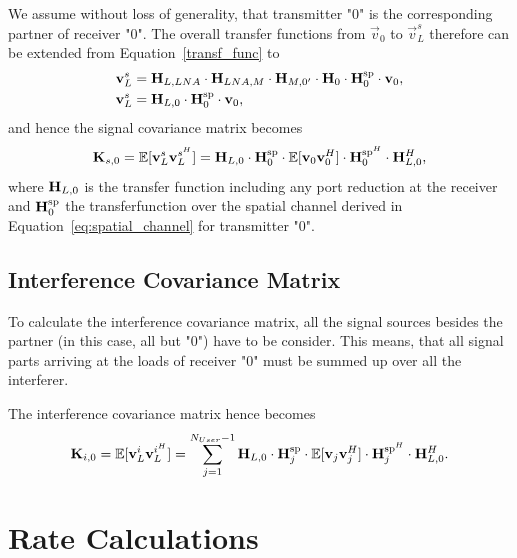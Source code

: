 We assume without loss of generality, that transmitter "0" is the corresponding partner of receiver "0".
The overall transfer functions from $\vec{v}_0$ to $\vec{v}_L^s$ therefore can be extended from Equation~\eqref{transf_func} to
\begin{align}
\label{eq:transfer_function}
 \mathbf{v}_L^s&= \mathbf{H}_{L,LNA}\cdot\mathbf{H}_{LNA,M}\cdot\mathbf{H}_{M,0'}
		\cdot \mathbf{H}_0\cdot\mathbf{H}_{0}^{\text{sp}} \cdot\mathbf{v}_0,\\\nonumber
 \mathbf{v}_L^s&=\mathbf{H}_{L,0}\cdot \mathbf{H}_{0}^{\text{sp}}\cdot\mathbf{v}_0,
\end{align}
and hence the signal covariance matrix becomes
\begin{equation}
\label{eq:sig_cov}
\mathbf{K}_{s,0}=\mathbb{E}[\mathbf{v}_L^s\mathbf{v}_L^{s^H}] = 
	\mathbf{H}_{L,0}\cdot \mathbf{H}_{0}^{\text{sp}}
	\cdot\mathbb{E}[\mathbf{v}_0\mathbf{v}_0^H]\cdot
	\mathbf{H}_{0}^{\text{sp}^H} \cdot \mathbf{H}_{L,0}^H,
\end{equation}
where $\mathbf{H}_{L,0}$ is the transfer function including any port reduction at the receiver and $\mathbf{H}_{0}^{\text{sp}}$ the transferfunction over the spatial channel derived in Equation~\eqref{eq:spatial_channel} for transmitter "0".

\subsection{Interference Covariance Matrix}
\label{sec:int_cov}

To calculate the interference covariance matrix, all the signal sources besides the partner (in this case, all but "0") have to be consider.
This means, that all signal parts arriving at the loads of receiver "0" must be summed up over all the interferer.

The interference covariance matrix hence becomes 
\begin{equation}
\label{eq:interf_cov}
\mathbf{K}_{i,0}=\mathbb{E}[\mathbf{v}_L^i\mathbf{v}_L^{i^H}] = \sum_{j=1}^{N_{User}-1} 
	\mathbf{H}_{L,0} \cdot \mathbf{H}_{j}^{\text{sp}} \cdot 
	\mathbb{E}[\mathbf{v}_{j}\mathbf{v}_{j}^H] \cdot 
	\mathbf{H}_{j}^{\text{sp}^H} \cdot \mathbf{H}_{L,0}^H.
\end{equation}





\section{Rate Calculations}
\label{sec:rates}

